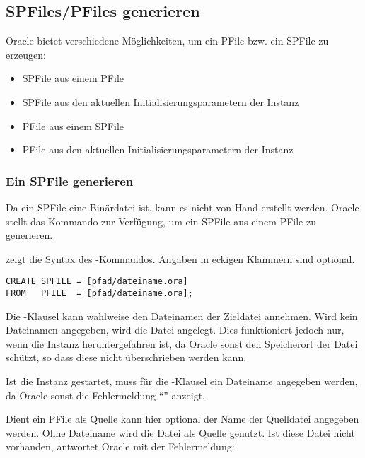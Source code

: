       \subsection{SPFiles/PFiles generieren}
        Oracle bietet verschiedene M\"oglichkeiten, um ein PFile bzw. ein SPFile zu erzeugen:
        \begin{itemize}
          \item SPFile aus einem PFile
          \item SPFile aus den aktuellen Initialisierungsparametern der Instanz
          \item PFile aus einem SPFile
          \item PFile aus den aktuellen Initialisierungsparametern der Instanz
        \end{itemize}
        \subsubsection{Ein SPFile generieren}
          Da ein SPFile eine Bin\"ardatei ist, kann es nicht von Hand erstellt werden. Oracle stellt das Kommando  zur Verf\"ugung, um ein SPFile aus einem PFile  zu generieren.

           zeigt die Syntax des -Kommandos. Angaben in eckigen Klammern sind optional.
          \begin{lstlisting}[caption={\languageorasql{CREATE SPFILE}},label=admin18,language=oracle_sql]
CREATE SPFILE = [pfad/dateiname.ora]
FROM   PFILE  = [pfad/dateiname.ora];
          \end{lstlisting}
          Die -Klausel kann wahlweise den Dateinamen der Zieldatei annehmen. Wird kein Dateinamen angegeben, wird die Datei  angelegt. Dies funktioniert jedoch nur, wenn die Instanz heruntergefahren ist, da Oracle sonst den Speicherort der Datei  sch\"utzt, so dass diese nicht \"uberschrieben werden kann.
          \begin{merke}
            Ist die Instanz gestartet, muss f\"ur die -Klausel ein Dateiname angegeben werden, da Oracle sonst die Fehlermeldung \enquote{} anzeigt.
          \end{merke}

          Dient ein PFile als Quelle kann  hier optional der Name der Quelldatei angegeben werden. Ohne Dateiname wird die Datei  als Quelle genutzt. Ist diese Datei nicht vorhanden, antwortet Oracle mit der Fehlermeldung:

